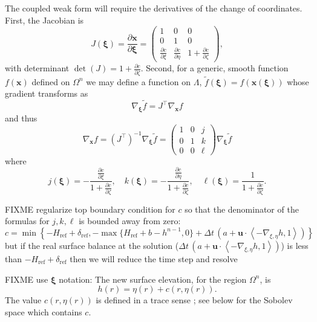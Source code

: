 \documentclass[letterpaper,final,12pt,reqno]{amsart}
\newcommand{\grad}{\nabla}
\newcommand{\bu}{\mathbf{u}}
\newcommand{\bx}{\mathbf{x}}
\newcommand{\bxi}{\bm{\xi}}
\newcommand{\Href}{H_{\text{ref}}}
\begin{document}
The coupled weak form will require the derivatives of the change of coordinates.  First, the Jacobian is
\begin{equation}
J(\bxi) = \frac{\partial \bx}{\partial \bm{\xi}} = \begin{pmatrix} 1 & 0 & 0 \\  0 & 1 & 0 \\ \frac{\partial c}{\partial \xi} & \frac{\partial c}{\partial \eta} & 1+\frac{\partial c}{\partial \zeta} \end{pmatrix}, \label{jacchange}
\end{equation}
with determinant $\det(J)=1+\frac{\partial c}{\partial \zeta}$.  Second, for a generic, smooth function $f(\bx)$ defined on $\Omega^n$ we may define a function on $\Lambda$, $\tilde f(\bxi) = f(\bx(\bxi))$ whose gradient transforms as
\begin{equation}
\grad_{\bxi} \tilde f = J^\top \grad_{\bx} f
\end{equation}
and thus
\begin{equation}
\grad_{\bx} f = (J^\top)^{-1} \grad_{\bxi} \tilde f = \begin{pmatrix} 1 & 0 & j \\ 0 & 1 & k \\ 0 & 0 & \ell \end{pmatrix} \grad_{\bxi} \tilde f \label{changederivatives}
\end{equation}
where
\begin{equation}
j(\bxi) = -\frac{\frac{\partial c}{\partial \xi}}{1+\frac{\partial c}{\partial \zeta}}, \quad k(\bxi) = -\frac{\frac{\partial c}{\partial \eta}}{1+\frac{\partial c}{\partial \zeta}}, \quad \ell(\bxi) = \frac{1}{1+\frac{\partial c}{\partial \zeta}}. \label{definejkl}
\end{equation}

\newcommand{\deltaref}{\delta_{\text{ref}}}

FIXME regularize top boundary condition for $c$ so that the denominator of the formulas for $j,k,\ell$ is bounded away from zero:
    $$c = \min\left\{-\Href + \deltaref,-\max\{\Href + b - h^{n-1},0\} + \Delta t\,(a + \bu \cdot \left<-\grad_{\xi,\eta}h,1\right>)\right\}$$
but if the real surface balance at the solution ($\Delta t\,(a + \bu \cdot \left<-\grad_{\xi,\eta}h,1\right>)$) is less than $-\Href+\deltaref$ then we will reduce the time step and resolve

FIXME use $\bxi$ notation: The new surface elevation, for the region $\Omega^n$, is
\begin{equation}
h(r) = \eta(r) + c(r,\eta(r)).  \label{newsurfaceelevation}
\end{equation}
The value $c(r,\eta(r))$ is defined in a trace sense \cite{Evans2010}; see below for the Sobolev space which contains $c$.
\end{document}
